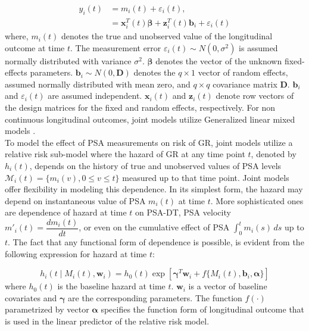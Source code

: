 \begin{equation*}
\begin{split}
y_i(t) &= m_i(t) + \varepsilon_i(t), \\
&= \boldsymbol{x}_i^T(t) \boldsymbol{\beta} + \boldsymbol{z}_i^T(t) \boldsymbol{b}_i + \varepsilon_i(t)
\end{split}
\end{equation*}
where, $m_i(t)$ denotes the true and unobserved value of the longitudinal outcome at time $t$. The measurement error $\varepsilon_i(t) \sim N(0, \sigma^2)$ is assumed normally distributed with variance $\sigma^2$. $\boldsymbol{\beta}$ denotes the vector of the unknown fixed-effects parameters. $\boldsymbol{b}_i \sim N(0, \boldsymbol{D})$ denotes the $q \times 1$ vector of random effects, assumed normally distributed with mean zero, and $q \times q$ covariance matrix $\boldsymbol{D}$. $\boldsymbol{b}_i$ and $\varepsilon_i(t)$ are assumed independent. $\boldsymbol{x}_i(t)$ and $\boldsymbol{z}_i(t)$ denote row vectors of the design matrices for the fixed and random effects, respectively. For non continuous longitudinal outcomes, joint models utilize Generalized linear mixed models \citep{rizopoulos2012joint}.\\

To model the effect of PSA measurements on risk of GR, joint models utilize a relative risk sub-model where the hazard of GR at any time point $t$, denoted by $h_i(t)$, depends on the history of true and unobserved values of PSA levels $\mathcal{M}_i(t) = \{m_i(v), 0\leq v \leq t\}$ measured up to that time point. Joint models offer flexibility in modeling this dependence. In its simplest form, the hazard may depend on instantaneous value of PSA $m_i(t)$ at time $t$. More sophisticated ones are dependence of hazard at time $t$ on PSA-DT, PSA velocity $m'_i(t) = \dfrac{d m_i(t)}{dt}$, or even on the cumulative effect of PSA $\int_0^t m_i(s) \,ds$ up to $t$. The fact that any functional form of dependence is possible, is evident from the following expression for hazard at time $t$:

\begin{equation*}
h_i(t \mid M_i(t), \boldsymbol{w}_i) = h_0(t) \exp[\boldsymbol{\gamma}^T\boldsymbol{w}_i + f\{M_i(t), \boldsymbol{b}_i, \boldsymbol{\alpha}\}]
\end{equation*}
where $h_0(t)$ is the baseline hazard at time $t$. $\boldsymbol{w}_i$ is a vector of baseline covariates and $\boldsymbol{\gamma}$ are the corresponding parameters. The function $f(\cdot)$ parametrized by vector $\boldsymbol{\alpha}$ specifies the function form of longitudinal outcome that is used in the linear predictor of the relative risk model.\\

